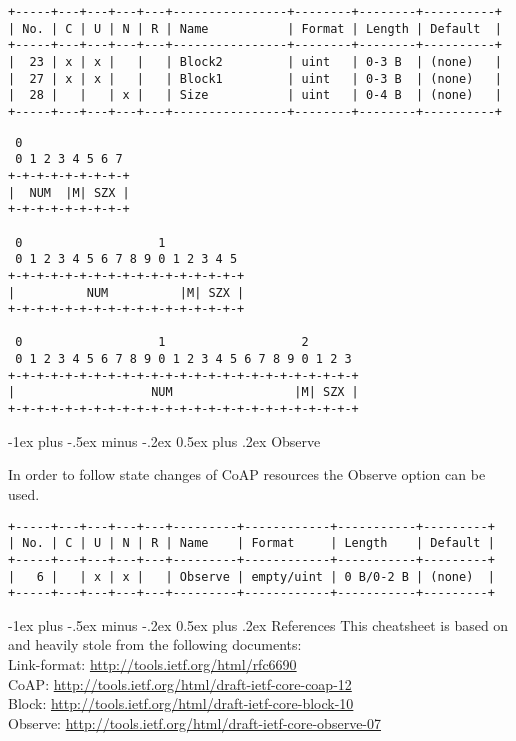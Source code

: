 \documentclass[10pt,landscape]{article}
\makeatletter
\renewcommand{\section}{\@startsection{section}{1}{0mm}%
                                {-1ex plus -.5ex minus -.2ex}%
                                {0.5ex plus .2ex}%
                                {\normalfont\large\bfseries}}
\makeatother
\begin{document}
\begin{multicols}{3}
{\tiny
\begin{verbatim}
+-----+---+---+---+---+----------------+--------+--------+----------+
| No. | C | U | N | R | Name           | Format | Length | Default  |
+-----+---+---+---+---+----------------+--------+--------+----------+
|  23 | x | x |   |   | Block2         | uint   | 0-3 B  | (none)   |
|  27 | x | x |   |   | Block1         | uint   | 0-3 B  | (none)   |
|  28 |   |   | x |   | Size           | uint   | 0-4 B  | (none)   |
+-----+---+---+---+---+----------------+--------+--------+----------+
\end{verbatim}
}
{\tiny
\begin{verbatim}
 0
 0 1 2 3 4 5 6 7
+-+-+-+-+-+-+-+-+
|  NUM  |M| SZX |
+-+-+-+-+-+-+-+-+

 0                   1
 0 1 2 3 4 5 6 7 8 9 0 1 2 3 4 5
+-+-+-+-+-+-+-+-+-+-+-+-+-+-+-+-+
|          NUM          |M| SZX |
+-+-+-+-+-+-+-+-+-+-+-+-+-+-+-+-+

 0                   1                   2
 0 1 2 3 4 5 6 7 8 9 0 1 2 3 4 5 6 7 8 9 0 1 2 3
+-+-+-+-+-+-+-+-+-+-+-+-+-+-+-+-+-+-+-+-+-+-+-+-+
|                   NUM                 |M| SZX |
+-+-+-+-+-+-+-+-+-+-+-+-+-+-+-+-+-+-+-+-+-+-+-+-+
\end{verbatim}
}

\section{Observe}

In order to follow state changes of CoAP resources the Observe option
can be used.

{\tiny
\begin{verbatim}
+-----+---+---+---+---+---------+------------+-----------+---------+
| No. | C | U | N | R | Name    | Format     | Length    | Default |
+-----+---+---+---+---+---------+------------+-----------+---------+
|   6 |   | x | x |   | Observe | empty/uint | 0 B/0-2 B | (none)  |
+-----+---+---+---+---+---------+------------+-----------+---------+
\end{verbatim}
}

\section{References}
This cheatsheet is based on and heavily stole from the following
documents:\\

{\tiny
Link-format: \url{http://tools.ietf.org/html/rfc6690}\\
CoAP: \url{http://tools.ietf.org/html/draft-ietf-core-coap-12}\\
Block: \url{http://tools.ietf.org/html/draft-ietf-core-block-10}\\
Observe: \url{http://tools.ietf.org/html/draft-ietf-core-observe-07}\\
}
%
%
\end{multicols}
\end{document}
